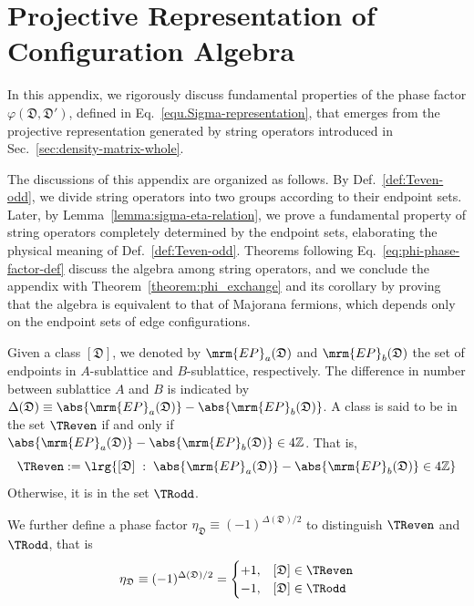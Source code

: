 \section{Projective Representation of Configuration Algebra}\label{appendix:projective-rep_old}

In this appendix, we rigorously discuss fundamental properties of the phase factor $\varphi(\mathfrak{D},\mathfrak{D}')$, defined in Eq.~\eqref{equ.Sigma-representation}, that emerges from the projective representation generated by string operators introduced in Sec.~\ref{sec:density-matrix-whole}. 

The discussions of this appendix are organized as follows. By Def.~\ref{def:Teven-odd}, we divide string operators into two groups according to their endpoint sets. Later, by Lemma~\ref{lemma:sigma-eta-relation}, we prove a fundamental property of string operators completely determined by the endpoint sets, elaborating the physical meaning of Def.~\ref{def:Teven-odd}. Theorems following Eq.~\eqref{eq:phi-phase-factor-def} discuss the algebra among string operators, and we conclude the appendix with Theorem~\ref{theorem:phi_exchange} and its corollary by proving that the algebra is equivalent to that of Majorana fermions, which depends only on the endpoint sets of edge configurations.

\begin{definition}\label{def:Teven-odd}
  Given a class $[\mathfrak{D}]$, we denoted by $\mrm{EP}_a(\mathfrak{D})$ and $\mrm{EP}_b(\mathfrak{D})$  the set of endpoints in $A$-sublattice and $B$-sublattice, respectively. The difference in number between sublattice $A$ and $B$ is indicated by $\Delta(\mathfrak{D}) \equiv \abs{\mrm{EP}_a(\mathfrak{D})}-\abs{\mrm{EP}_b(\mathfrak{D})}$. A class is said to be in the set $\TReven$ if and only if $\abs{\mrm{EP}_a(\mathfrak{D})}-\abs{\mrm{EP}_b(\mathfrak{D})} \in 4\mathbb{Z}$. That is,
  \[
  \TReven := \lrg{[\mathfrak{D}] \; :\; \abs{\mrm{EP}_a(\mathfrak{D})}-\abs{\mrm{EP}_b(\mathfrak{D})} \in 4\mathbb{Z}} 
  \]
  Otherwise, it is in the set $\TRodd$.
  
  We further define a phase factor $\eta_{\mathfrak{D}} \equiv (-1)^{\Delta(\mathfrak{D})/2}$ to distinguish $\TReven$ and $\TRodd$, that is
  \begin{equation}\label{eq:eta-def}
      \eta_\mathfrak{D}\equiv (-1)^{\Delta(\mathfrak{D})/2} = \begin{cases}
                       +1, & [\mathfrak{D}]\in\TReven \\
                       -1, & [\mathfrak{D}]\in\TRodd
                     \end{cases}
  \end{equation}
\end{definition}

